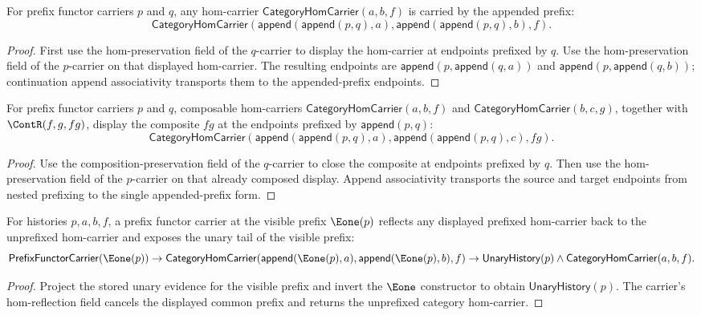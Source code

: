\begin{theorem}
\label{thm:prefix-functor-carrier-append-hom-preserves}
For prefix functor carriers \(p\) and \(q\), any hom-carrier
\(\mathsf{CategoryHomCarrier}(a,b,f)\) is carried by the appended prefix:
$$
\mathsf{CategoryHomCarrier}(\mathsf{append}(\mathsf{append}(p,q),a),
\mathsf{append}(\mathsf{append}(p,q),b),f).
$$
\end{theorem}
\begin{proof}
First use the hom-preservation field of the \(q\)-carrier to display the
hom-carrier at endpoints prefixed by \(q\). Use the hom-preservation field of
the \(p\)-carrier on that displayed hom-carrier. The resulting endpoints are
\(\mathsf{append}(p,\mathsf{append}(q,a))\) and
\(\mathsf{append}(p,\mathsf{append}(q,b))\); continuation append associativity
transports them to the appended-prefix endpoints.
\end{proof}

\begin{theorem}
\label{thm:prefix-functor-carrier-append-comp-preserves}
For prefix functor carriers \(p\) and \(q\), composable hom-carriers
\(\mathsf{CategoryHomCarrier}(a,b,f)\) and
\(\mathsf{CategoryHomCarrier}(b,c,g)\), together with \(\ContR(f,g,fg)\),
display the composite \(fg\) at the endpoints prefixed by
\(\mathsf{append}(p,q)\):
$$
\mathsf{CategoryHomCarrier}(\mathsf{append}(\mathsf{append}(p,q),a),
\mathsf{append}(\mathsf{append}(p,q),c),fg).
$$
\end{theorem}
\begin{proof}
Use the composition-preservation field of the \(q\)-carrier to close the
composite at endpoints prefixed by \(q\). Then use the hom-preservation field
of the \(p\)-carrier on that already composed display. Append associativity
transports the source and target endpoints from nested prefixing to the single
appended-prefix form.
\end{proof}

\begin{theorem}
\label{thm:prefix-functor-carrier-e1-prefix-hom-reflects}
For histories $p,a,b,f$, a prefix functor carrier at the visible prefix
$\Eone(p)$ reflects any displayed prefixed hom-carrier back to the unprefixed
hom-carrier and exposes the unary tail of the visible prefix:
$$
\mathsf{PrefixFunctorCarrier}(\Eone(p))\to
\mathsf{CategoryHomCarrier}(\mathsf{append}(\Eone(p),a),
\mathsf{append}(\Eone(p),b),f)\to
\mathsf{UnaryHistory}(p)\land\mathsf{CategoryHomCarrier}(a,b,f).
$$
\end{theorem}
\begin{proof}
Project the stored unary evidence for the visible prefix and invert the
$\Eone$ constructor to obtain $\mathsf{UnaryHistory}(p)$. The carrier's
hom-reflection field cancels the displayed common prefix and returns the
unprefixed category hom-carrier.
\end{proof}

